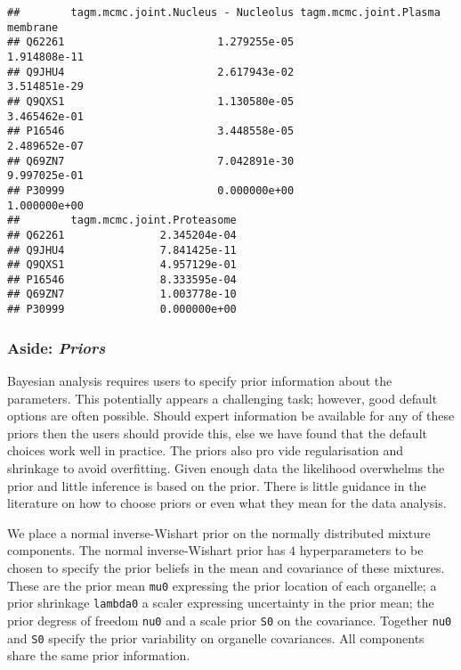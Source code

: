 \documentclass[]{article}
\begin{document}
\begin{verbatim}
##        tagm.mcmc.joint.Nucleus - Nucleolus tagm.mcmc.joint.Plasma membrane
## Q62261                        1.279255e-05                    1.914808e-11
## Q9JHU4                        2.617943e-02                    3.514851e-29
## Q9QXS1                        1.130580e-05                    3.465462e-01
## P16546                        3.448558e-05                    2.489652e-07
## Q69ZN7                        7.042891e-30                    9.997025e-01
## P30999                        0.000000e+00                    1.000000e+00
##        tagm.mcmc.joint.Proteasome
## Q62261               2.345204e-04
## Q9JHU4               7.841425e-11
## Q9QXS1               4.957129e-01
## P16546               8.333595e-04
## Q69ZN7               1.003778e-10
## P30999               0.000000e+00
\end{verbatim}

\subsubsection*{\texorpdfstring{Aside:
\emph{Priors}}{Aside: Priors}}\label{aside-priors}

Bayesian analysis requires users to specify prior information about the
parameters. This potentially appears a challenging task; however, good
default options are often possible. Should expert information be
available for any of these priors then the users should provide this,
else we have found that the default choices work well in practice. The
priors also pro vide regularisation and shrinkage to avoid overfitting.
Given enough data the likelihood overwhelms the prior and little
inference is based on the prior. There is little guidance in the
literature on how to choose priors or even what they mean for the data
analysis.

We place a normal inverse-Wishart prior on the normally distributed
mixture components. The normal inverse-Wishart prior has \(4\)
hyperparameters to be chosen to specify the prior beliefs in the mean
and covariance of these mixtures. These are the prior mean \texttt{mu0}
expressing the prior location of each organelle; a prior shrinkage
\texttt{lambda0} a scaler expressing uncertainty in the prior mean; the
prior degress of freedom \texttt{nu0} and a scale prior \texttt{S0} on
the covariance. Together \texttt{nu0} and \texttt{S0} specify the prior
variability on organelle covariances. All components share the same
prior information.
\end{document}
